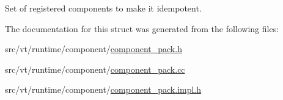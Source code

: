 Set of registered components to make it idempotent. 



The documentation for this struct was generated from the following files\+:\begin{DoxyCompactItemize}
\item 
src/vt/runtime/component/\hyperlink{component__pack_8h}{component\+\_\+pack.\+h}\item 
src/vt/runtime/component/\hyperlink{component__pack_8cc}{component\+\_\+pack.\+cc}\item 
src/vt/runtime/component/\hyperlink{component__pack_8impl_8h}{component\+\_\+pack.\+impl.\+h}\end{DoxyCompactItemize}
